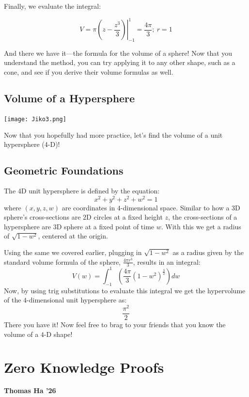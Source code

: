 \documentclass{article}
\begin{document}
\begin{multicols}{2}
Finally, we evaluate the integral:

\begin{equation*}
    V = \left. \pi (z - \frac{z^3}{3})\right\vert_{-1}^{1} = \frac{4\pi}{3}; \ r = 1
\end{equation*}

And there we have it---the formula for the volume of a sphere! Now that you understand the method, you can try applying it to any other shape, such as a cone, and see if you derive their volume formulas as well.
\subsection*{Volume of a Hypersphere}
\begin{center}
    \texttt{[image: Jiko3.png]}
\end{center}
Now that you hopefully had more practice, let's find the volume of a unit hypersphere (4-D)!
\subsection*{Geometric Foundations}
The 4D unit hypersphere is defined by the equation:
\begin{equation*}
    x^2 + y^2 + z^2 + w^2 = 1
\end{equation*}
where $(x,y,z,w)$ are coordinates in $4$-dimensional space. Similar to how a $3$D sphere’s cross-sections are $2$D circles at a fixed height $z$, the cross-sections of a hypersphere are $3$D sphere at a fixed point of time $w$. With this we get a radius of $\sqrt{1 - w^2}$, centered at the origin.

Using the same we covered earlier, plugging in $\sqrt{1 - w^2}$ as a radius given by the standard volume formula of the sphere, $\frac{4\pi r^3}{3}$, results in an integral: 
\begin{equation*}
    V(w) = \int_{-1}^{1}(\frac{4\pi}{3}(1 - w^2)^\frac{3}{2})dw
\end{equation*}
Now, by using trig substitutions to evaluate this integral we get the hypervolume of the $4$-dimensional unit hypersphere as:
\begin{equation*}
    \frac{\pi^2}{2}
\end{equation*}
There you have it! Now feel free to brag to your friends that you know the volume of a $4$-D shape!
\section*{Zero Knowledge Proofs}
\noindent\textbf{Thomas Ha '26}
\medbreak


\end{multicols}
\end{document}
